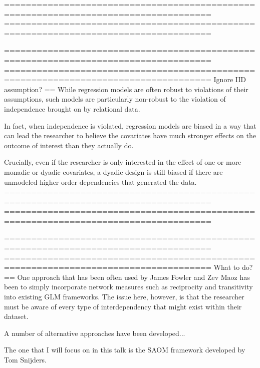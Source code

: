 ====================================================================================
====================================================================================

====================================================================================
====================================================================================
Ignore IID assumption?
==
While regression models are often robust to violations of their assumptions, such models are particularly non-robust to the violation of independence brought on by relational data. 

In fact, when independence is violated, regression models are biased in a way that can lead the researcher to believe the covariates have much stronger effects on the outcome of interest than they actually do. 

Crucially, even if the researcher is only interested in the effect of one or more monadic or dyadic covariates, a dyadic design is still biased if there are unmodeled higher order dependencies that generated the data.
====================================================================================
====================================================================================

====================================================================================
====================================================================================
What to do?
==
One approach that has been often used by James Fowler and Zev Maoz has been to simply incorporate network measures such as reciprocity and transitivity into existing GLM frameworks. The issue here, however, is that the researcher must be aware of every type of interdependency that might exist within their dataset. 


A number of alternative approaches have been developed...

The one that I will focus on in this talk is the SAOM framework developed by Tom Snijders.

